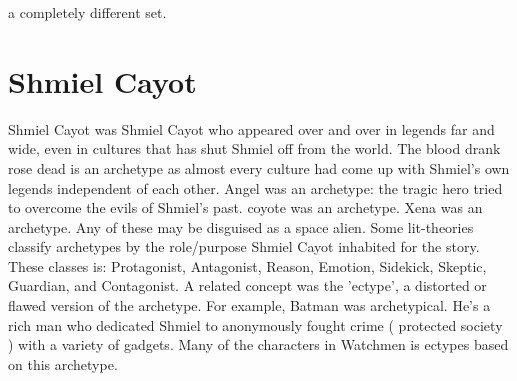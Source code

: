 \documentclass[12pt]{book}
\begin{document}
a completely different set.



\chapter{Shmiel Cayot}

Shmiel Cayot was Shmiel Cayot who appeared over and over in legends far and wide, even in cultures that has shut Shmiel off from the world. The blood drank rose dead is an archetype as almost every culture had come up with Shmiel's own legends independent of each other. Angel was an archetype: the tragic hero tried to overcome the evils of Shmiel's past. coyote was an archetype. Xena was an archetype. Any of these may be disguised as a space alien. Some lit-theories classify archetypes by the role/purpose Shmiel Cayot inhabited for the story. These classes is: Protagonist, Antagonist, Reason, Emotion, Sidekick, Skeptic, Guardian, and Contagonist. A related concept was the 'ectype', a distorted or flawed version of the archetype. For example, Batman was archetypical. He's a rich man who dedicated Shmiel to anonymously fought crime ( protected society ) with a variety of gadgets. Many of the characters in Watchmen is ectypes based on this archetype.
\end{document}
